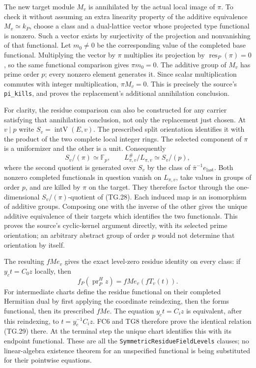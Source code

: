 \documentclass[11pt,a4paper]{article}
\numberwithin{equation}{section}
\theoremstyle{remark}\newtheorem{remark}[theorem]{Remark}
\begin{document}
The new target module $M_v$ is annihilated by the actual
local image of $\pi$. To check it without assuming an extra
linearity property of the additive equivalence $M_v\simeq k_P$,
choose a class and a dual-lattice vector whose projected type
functional is nonzero. Such a vector exists by surjectivity of
the projection and nonvanishing of that functional. Let
$m_0\ne0$ be the corresponding value of the completed base
functional. Multiplying the vector by $\pi$ multiplies its
projection by $\operatorname{res}_P(\pi)=0$, so the same
functional comparison gives $\pi m_0=0$. The additive group
of $M_v$ has prime order $p$; every nonzero element generates
it. Since scalar multiplication commutes with integer
multiplication, $\pi M_v=0$. This is precisely the source's
\texttt{pi\_\allowbreak kills}, and proves the replacement's additional
annihilation conclusion.

For clarity, the residue comparison can also be constructed for
any carrier satisfying that annihilation conclusion, not only
the replacement just chosen. At $v\mid p$ write
$S_v=\operatorname{intV}(E,v)$. The prescribed split orientation
identifies it with the product of the two complete local integer
rings. The selected component of $\pi$ is a uniformizer and
the other is a unit. Consequently
\[
 S_v/(\pi)\simeq\mathbb F_p,\qquad
 L_{\pi,v}^{\#}/L_{\pi,v}\simeq S_v/(p),
 \tag{TG.28}
\]
where the second quotient is generated over $S_v$ by the
class of $\bar\pi^{-1}e_{\mathrm{last}}$. Both nonzero completed
functionals in question vanish on $L_{\pi,v}$, take values
in groups of order $p$, and are killed by $\pi$ on the target.
They therefore factor through the one-dimensional
$S_v/(\pi)$-quotient of (TG.28). Each induced map is an
isomorphism of additive groups. Composing one with the inverse
of the other gives the unique additive equivalence of their
targets which identifies the two functionals. This proves the
source's cyclic-kernel argument directly, with its selected
prime orientation; an arbitrary abstract group of order $p$
would not determine that orientation by itself.

The resulting $fMe_v$ gives the exact level-zero residue identity
on every class: if $y_c t=C_0z$ locally, then
\[
        f_P(\operatorname{pr}^{H}_P z)=fMe_v(fT_v(t)).
 \tag{TG.29}
\]
For intermediate charts define the residue functional on their
completed Hermitian dual by first applying the coordinate
reindexing, then the forms functional, then its prescribed
$fMe$. The equation $y_ct=C_i z$ is equivalent, after this
reindexing, to $t=y_c^{-1}C_i z$. FC6 and TG8 therefore prove
the identical relation (TG.29) there. At the terminal step the
unique chart identifies this with its endpoint functional.
These are all the \texttt{SymmetricResidueFieldLevels}
clauses; no linear-algebra existence theorem for an unspecified
functional is being substituted for their pointwise equations.
\end{document}
